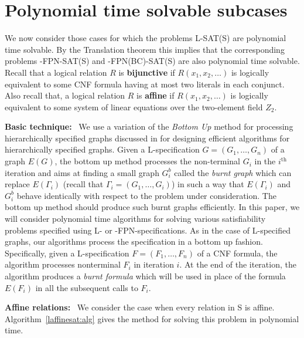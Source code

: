 \section{Polynomial time solvable subcases}\label{sec:poly}

We now consider those  cases for which the problems 
{\sf L-SAT(S)} are polynomial time solvable.
By the Translation theorem this implies that the corresponding 
problems {-FPN-SAT(S)} and  {-FPN(BC)-SAT(S)} 
are also polynomial time solvable.
Recall that a logical relation $R$ is {\bf bijunctive} if
$R(x_1,x_2,\ldots)$ is logically equivalent to some CNF formula having at
most two literals in each conjunct.
Also recall that, 
a logical relation $R$ is {\bf affine} if $R(x_1,x_2,\ldots)$ is logically 
equivalent to some system of linear equations over the two-element field $Z_2$.

\smallskip

\noindent
\textbf{Basic technique:}~
We use a variation of the {\it Bottom Up}
method for processing hierarchically  specified graphs discussed 
in \cite{LW87a,Le88,Le89,Wi90}
for designing efficient algorithms for hierarchically specified  graphs. 
Given a {\sf L}-specification $G = (G_1, \ldots, G_n)$ of  a graph $E(G)$,
the bottom up method processes the non-terminal $G_i$ in the $i^{\mathrm{th}}$ iteration
and aims at finding a small graph $G_i^{b}$ called the 
{\it burnt graph} which can replace $E(\Gamma_i)$ 
(recall  that $ \Gamma_i = (G_1, \ldots, G_i)$) 
in such a way that $E(\Gamma_i)$ and $G_i^{b}$ behave 
identically with respect to the problem
under consideration.
The bottom up method should produce such burnt graphs efficiently.
In this paper, we will consider polynomial time algorithms for solving
various satisfiability problems specified using {\sf L}- or 
{-FPN}-specifications. As in the case of {\sf L}-specified graphs, 
our algorithms process the specification in a bottom up fashion. Specifically,
given a {\sf L}-specification $F = (F_1, \ldots, F_n)$ of a {\sf CNF}
formula, the algorithm processes nonterminal $F_i$ in iteration $i$. At the end
of the iteration, the algorithm produces a {\em burnt formula} which will
be used in place of the formula $E(F_i)$ in all the subsequent calls to $F_i$.

\smallskip

\noindent
\textbf{Affine relations:}~
We consider the case when every relation in {\sf S} is affine. 
Algorithm~\ref{laffinesat:alg} gives the method for solving this problem in 
polynomial time.

